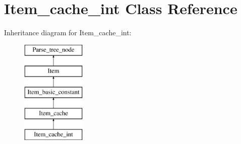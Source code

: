 \hypertarget{classItem__cache__int}{}\section{Item\+\_\+cache\+\_\+int Class Reference}
\label{classItem__cache__int}
Inheritance diagram for Item\+\_\+cache\+\_\+int\+:\begin{figure}[H]
\begin{center}
\leavevmode
\includegraphics[height=5.000000cm]{classItem__cache__int}
\end{center}
\end{figure}
